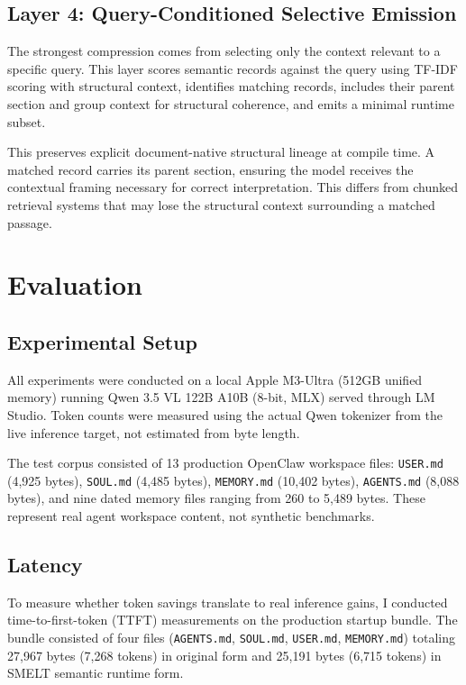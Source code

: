 \documentclass[11pt,a4paper]{article}
\begin{document}
\subsection{Layer 4: Query-Conditioned Selective Emission}

The strongest compression comes from selecting only the context relevant to a specific query. This layer scores semantic records against the query using TF-IDF scoring with structural context, identifies matching records, includes their parent section and group context for structural coherence, and emits a minimal runtime subset.

This preserves explicit document-native structural lineage at compile time. A matched record carries its parent section, ensuring the model receives the contextual framing necessary for correct interpretation. This differs from chunked retrieval systems that may lose the structural context surrounding a matched passage.

\section{Evaluation}

\subsection{Experimental Setup}

All experiments were conducted on a local Apple M3-Ultra (512GB unified memory) running Qwen 3.5 VL 122B A10B (8-bit, MLX) served through LM Studio. Token counts were measured using the actual Qwen tokenizer from the live inference target, not estimated from byte length.

The test corpus consisted of 13 production OpenClaw workspace files: \texttt{USER.md} (4,925 bytes), \texttt{SOUL.md} (4,485 bytes), \texttt{MEMORY.md} (10,402 bytes), \texttt{AGENTS.md} (8,088 bytes), and nine dated memory files ranging from 260 to 5,489 bytes. These represent real agent workspace content, not synthetic benchmarks.

\subsection{Latency}

To measure whether token savings translate to real inference gains, I conducted time-to-first-token (TTFT) measurements on the production startup bundle. The bundle consisted of four files (\texttt{AGENTS.md}, \texttt{SOUL.md}, \texttt{USER.md}, \texttt{MEMORY.md}) totaling 27,967 bytes (7,268 tokens) in original form and 25,191 bytes (6,715 tokens) in SMELT semantic runtime form.
\end{document}
